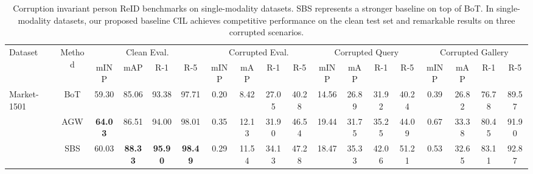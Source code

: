 \setlength{\tabcolsep}{2.0pt}
\begin{table}[t]
    \scriptsize
    \renewcommand\arraystretch{1.5}
    \centering
    \caption{Corruption invariant person ReID benchmarks on single-modality datasets. SBS \cite{DBLP:journals/corr/abs-2006-02631} represents a stronger baseline on top of BoT. In single-modality datasets, our proposed baseline CIL achieves competitive performance on the clean test set and remarkable results on three corrupted scenarios.}
    \vspace{1mm}
    \begin{tabular}{lc|cccc|cccc|cccc|cccc}
        \hline
        \multirow{2}{*}{Dataset}     & \multirow{2}{*}{Method} & \multicolumn{4}{c|}{Clean Eval.} & \multicolumn{4}{c|}{Corrupted Eval.} & \multicolumn{4}{c|}{Corrupted Query} & \multicolumn{4}{c}{Corrupted Gallery}                                                                                                                                                                                                           \\
                                     &                         & mINP                             & mAP                                  & R-1                                  & R-5                                   & mINP          & mAP            & R-1            & R-5            & mINP           & mAP            & R-1            & R-5            & mINP          & mAP            & R-1            & R-5            \\
        \hline
        \multirow{4}{*}{Market-1501} & BoT                     & 59.30                            & 85.06                                & 93.38                                & 97.71                                 & 0.20          & 8.42           & 27.05          & 40.28          & 14.56          & 26.89          & 31.92          & 40.24          & 0.39          & 26.82          & 76.78          & 89.57          \\
                                     & AGW                     & \textbf{64.03}                   & 86.51                                & 94.00                                & 98.01                                 & 0.35          & 12.13          & 31.90          & 46.54          & 19.44          & 31.75          & 35.25          & 44.09          & 0.67          & 33.38          & 80.45          & 91.90          \\
                                     & SBS                     & 60.03                            & \textbf{88.33}                       & \textbf{95.90}                       & \textbf{98.49}                        & 0.29          & 11.54          & 34.13          & 47.28          & 18.47          & 35.33          & 42.06          & 51.21          & 0.53          & 32.65          & 83.11          & 92.87          \\

\end{tabular}
\end{table}
